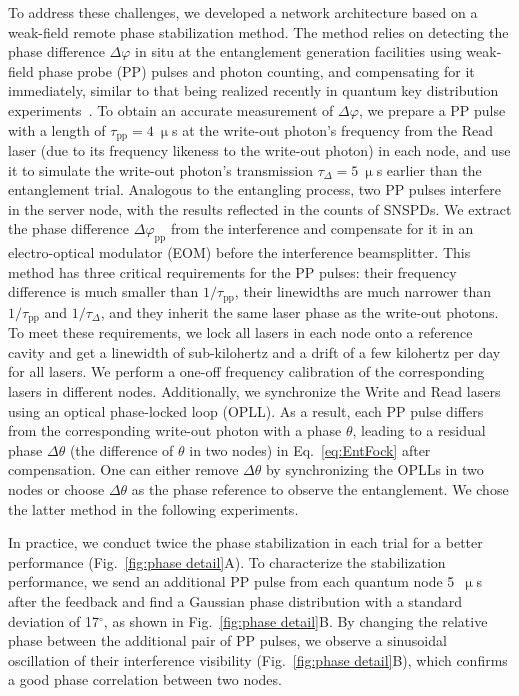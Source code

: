 \documentclass[aps,reprint,showpacs,superscriptaddress]{revtex4-2}
\begin{document}
To address these challenges, we developed a network architecture based on a weak-field remote phase stabilization method. The method relies on detecting the phase difference $\Delta\varphi$ in situ at the entanglement generation facilities using weak-field phase probe (PP) pulses and photon counting, and compensating for it immediately, similar to that being realized recently in quantum key distribution experiments~\cite{zhou2023}. To obtain an accurate measurement of $\Delta\varphi$, we prepare a PP pulse with a length of $\tau_{\textrm{pp}}=4~\upmu$s at the write-out photon's frequency from the Read laser (due to its frequency likeness to the write-out photon) in each node, and use it to simulate the write-out photon's transmission $\tau_{\Delta}=5~\upmu$s earlier than the entanglement trial. Analogous to the entangling process, two PP pulses interfere in the server node, with the results reflected in the counts of SNSPDs. We extract the phase difference $\Delta\varphi_{\text{pp}}$ from the interference and compensate for it in an electro-optical modulator (EOM) before the interference beamsplitter. This method has three critical requirements for the PP pulses: their frequency difference is much smaller than $1/\tau_{\textrm{pp}}$, their linewidths are much narrower than $1/\tau_{\textrm{pp}}$ and $1/\tau_{\Delta}$, and they inherit the same laser phase as the write-out photons. To meet these requirements, we lock all lasers in each node onto a reference cavity and get a linewidth of sub-kilohertz and a drift of a few kilohertz per day for all lasers. We perform a one-off frequency calibration of the corresponding lasers in different nodes. Additionally, we synchronize the Write and Read lasers using an optical phase-locked loop (OPLL). As a result, each PP pulse differs from the corresponding write-out photon with a phase $\theta$, leading to a residual phase $\Delta\theta$ (the difference of $\theta$ in two nodes) in Eq.~\ref{eq:EntFock} after compensation. One can either remove $\Delta\theta$ by synchronizing the OPLLs in two nodes or choose $\Delta\theta$ as the phase reference to observe the entanglement. We chose the latter method in the following experiments.

In practice, we conduct twice the phase stabilization in each trial for a better performance (Fig.~\ref{fig:phase detail}A). To characterize the stabilization performance, we send an additional PP pulse from each quantum node 5~$\upmu$s after the feedback and find a Gaussian phase distribution with a standard deviation of 17$^{\circ}$, as shown in Fig.~\ref{fig:phase detail}B. By changing the relative phase between the additional pair of PP pulses, we observe a sinusoidal oscillation of their interference visibility (Fig.~\ref{fig:phase detail}B), which confirms a good phase correlation between two nodes.
\end{document}
